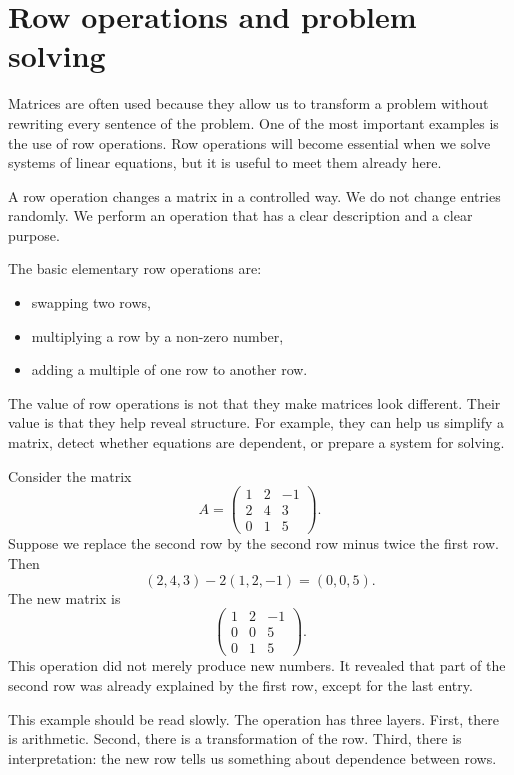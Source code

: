 \section{Row operations and problem solving}

Matrices are often used because they allow us to transform a problem without rewriting every sentence of the problem. One of the most important examples is the use of row operations. Row operations will become essential when we solve systems of linear equations, but it is useful to meet them already here.

A row operation changes a matrix in a controlled way. We do not change entries randomly. We perform an operation that has a clear description and a clear purpose.

\begin{definitionbox}
The basic elementary row operations are:
\begin{itemize}
\item swapping two rows,
\item multiplying a row by a non-zero number,
\item adding a multiple of one row to another row.
\end{itemize}
\end{definitionbox}

The value of row operations is not that they make matrices look different. Their value is that they help reveal structure. For example, they can help us simplify a matrix, detect whether equations are dependent, or prepare a system for solving.

\begin{examplebox}
Consider the matrix
\[
A=
\begin{pmatrix}
1 & 2 & -1\\
2 & 4 & 3\\
0 & 1 & 5
\end{pmatrix}.
\]
Suppose we replace the second row by the second row minus twice the first row. Then
\[
(2,4,3)-2(1,2,-1)=(0,0,5).
\]
The new matrix is
\[
\begin{pmatrix}
1 & 2 & -1\\
0 & 0 & 5\\
0 & 1 & 5
\end{pmatrix}.
\]
This operation did not merely produce new numbers. It revealed that part of the second row was already explained by the first row, except for the last entry.
\end{examplebox}

This example should be read slowly. The operation has three layers. First, there is arithmetic. Second, there is a transformation of the row. Third, there is interpretation: the new row tells us something about dependence between rows.

